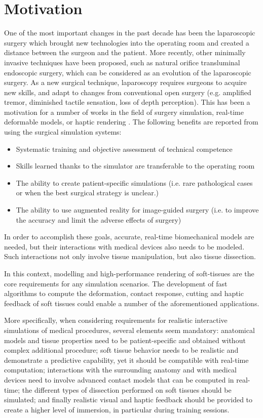 \section{Motivation}
One of the most important changes in the past decade has been the laparoscopic surgery which brought new technologies into the operating room and created a 
distance between the surgeon and the patient. More recently, other minimally invasive techniques have been proposed, such as natural orifice transluminal 
endoscopic surgery, which can be considered as an evolution of the laparoscopic surgery. As a new surgical technique, laparoscopy requires surgeons to acquire 
new skills, and adapt to changes from conventional open surgery (e.g. amplified tremor, diminished tactile sensation, loss of depth perception). This has been 
a motivation for a number of works in the field of surgery simulation, real-time deformable models, or haptic rendering \cite{Lin2004}. The following benefits are reported
from using the surgical simulation systems:

\begin{itemize}
 \item Systematic training and objective assessment of technical competence
 \item Skills learned thanks to the simulator are transferable to the operating room
 \item The ability to create patient-specific simulations (i.e. rare pathological cases or when the best surgical strategy is unclear.)
 \item The ability to use augmented reality for image-guided surgery (i.e. to improve the accuracy and limit the adverse effects of surgery)
\end{itemize}

In order to accomplish these goals, accurate, real-time biomechanical models are needed, but their interactions with medical devices also needs to be modeled.
Such interactions not only involve tissue manipulation, but also tissue dissection. 

In this context, modelling and high-performance rendering of soft-tissues are the core requirements for any simulation scenarios. 
The development of fast algorithms to compute the deformation, contact response, cutting and haptic feedback of soft tissues could enable a number of the 
aforementioned applications.

More specifically, when considering requirements for realistic interactive simulations of medical procedures, several elements seem mandatory: anatomical 
models and tissue properties need to be patient-specific and obtained without complex additional procedure; soft tissue behavior needs to be realistic and 
demonstrate a predictive capability, yet it should be compatible with real-time computation; interactions with the surrounding anatomy and with medical 
devices need to involve advanced contact models that can be computed in real-time; the different types of dissection performed on soft tissues should be 
simulated; and finally realistic visual and haptic feedback should be provided to create a higher level of immersion, in particular during training sessions.

